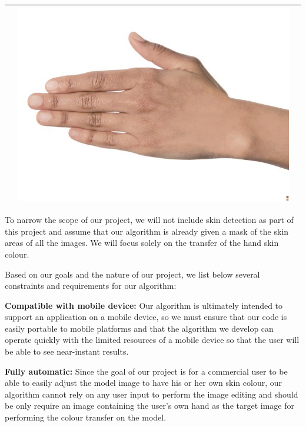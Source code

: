 \begin{table}[H]
\begin{tabular}{|c|c|c|}
\begin{minipage}{.29\textwidth}
	  \end{minipage} & 
	  \begin{minipage}{.29\textwidth}
	    \includegraphics[width=\textwidth,height=\textheight,keepaspectratio]{../rc_test/outputs/20170524_prop_corr_1p1_ave_100/hand_brown_to_hand_light.jpg}
	  \end{minipage} \\
	\hline
 \end{tabular}
 \end{table}

To narrow the scope of our project, we will not include skin detection as part of this project and assume that our algorithm is already given a mask of the skin areas of all the images. We will focus solely on the transfer of the hand skin colour. 

Based on our goals and the nature of our project, we list below several constraints and requirements for our algorithm:

\textbf{Compatible with mobile device:} Our algorithm is ultimately intended to support an application on a mobile device, so we must ensure that our code is easily portable to mobile platforms and that the algorithm we develop can operate quickly with the limited resources of a mobile device so that the user will be able to see near-instant results.

\textbf{Fully automatic:} Since the goal of our project is for a commercial user to be able to easily adjust the model image to have his or her own skin colour, our algorithm cannot rely on any user input to perform the image editing and should be only require an image containing the user's own hand as the target image for performing the colour transfer on the model.

